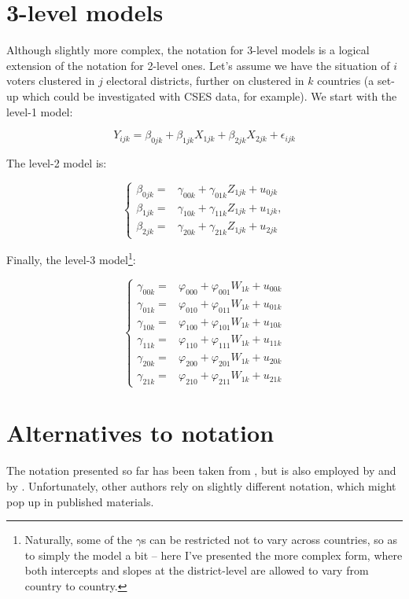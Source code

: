 \documentclass[12pt,english]{article}\usepackage[]{graphicx}\usepackage[usenames, dvipsnames]{xcolor}
\begin{document}
\section{3-level models}
Although slightly more complex, the notation for 3-level models is a logical extension of the notation for 2-level ones. Let's assume we have the situation of $i$ voters clustered in $j$ electoral districts, further on clustered in $k$ countries (a set-up which could be investigated with CSES data, for example). We start with the level-1 model:

\begin{equation}
Y_{ijk}=\beta_{0jk}+\beta_{1jk}X_{1jk}+\beta_{2jk}X_{2jk}+\epsilon_{ijk}
\label{eq:eq-05}
\end{equation}

The level-2 model is:

\begin{equation}
\begin{cases}
\beta_{0jk}= & \gamma_{00k}+\gamma_{01k}Z_{1jk}+u_{0jk}\\
\beta_{1jk}= & \gamma_{10k}+\gamma_{11k}Z_{1jk}+u_{1jk},\\
\beta_{2jk}= & \gamma_{20k}+\gamma_{21k}Z_{1jk}+u_{2jk}
\end{cases}
\label{eq:eq-06}
\end{equation}

Finally, the level-3 model\footnote{Naturally, some of the $\gamma$s can be restricted not to vary across countries, so as to simply the model a bit -- here I've presented the more complex form, where both intercepts and slopes at the district-level are allowed to vary from country to country.}:

\begin{equation}
\begin{cases}
\gamma_{00k}= & \varphi_{000}+\varphi_{001}W_{1k}+u_{00k}\\
\gamma_{01k}= & \varphi_{010}+\varphi_{011}W_{1k}+u_{01k}\\
\gamma_{10k}= & \varphi_{100}+\varphi_{101}W_{1k}+u_{10k}\\
\gamma_{11k}= & \varphi_{110}+\varphi_{111}W_{1k}+u_{11k}\\
\gamma_{20k}= & \varphi_{200}+\varphi_{201}W_{1k}+u_{20k}\\
\gamma_{21k}= & \varphi_{210}+\varphi_{211}W_{1k}+u_{21k}
\end{cases}
\label{eq:eq-07}
\end{equation}


\section{Alternatives to notation}
The notation presented so far has been taken from , but is also employed by  and by . Unfortunately, other authors rely on slightly different notation, which might pop up in published materials.
\end{document}
